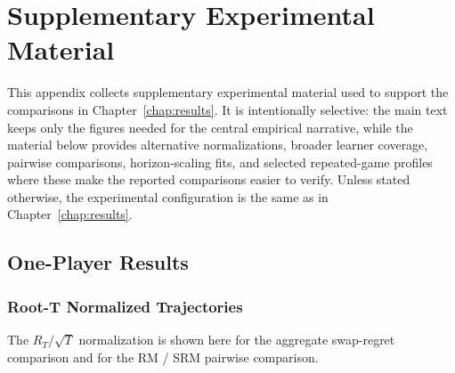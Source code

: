 
\chapter{Supplementary Experimental Material}
\label{app:supplementary-results}

This appendix collects supplementary experimental material used to support the
comparisons in Chapter~\ref{chap:results}. It is intentionally selective: the
main text keeps only the figures needed for the central empirical narrative,
while the material below provides alternative normalizations, broader learner
coverage, pairwise comparisons, horizon-scaling fits, and selected repeated-game
profiles where these make the reported comparisons easier to verify. Unless stated otherwise, the
experimental configuration is the same as in Chapter~\ref{chap:results}.

\clearpage
\section{One-Player Results}
\label{app:one-player-results}

\subsection{Root-T Normalized Trajectories}
\label{app:one-player-trajectories}

The \(R_T/\sqrt{T}\) normalization is shown here for the aggregate
swap-regret comparison and for the RM / SRM pairwise comparison.

